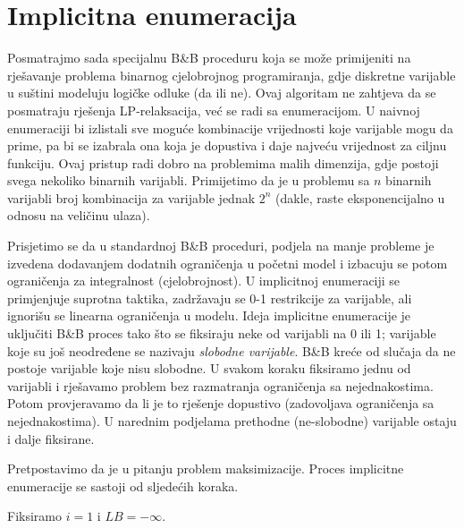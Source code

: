 \documentclass[a4paper, utf8, 11pt, colorlinks]{book}
\begin{document}
\section{Implicitna enumeracija}
Posmatrajmo sada specijalnu B\&B proceduru koja se može primijeniti na rješavanje problema binarnog cjelobrojnog programiranja, gdje diskretne varijable u suštini modeluju logičke odluke (da ili ne). Ovaj algoritam ne zahtjeva da se posmatraju rješenja LP-relaksacija, već se radi sa enumeracijom. U naivnoj enumeraciji bi izlistali sve moguće kombinacije vrijednosti koje varijable mogu da prime, pa bi se izabrala ona koja je dopustiva i daje najveću vrijednost za ciljnu funkciju. Ovaj pristup radi dobro na problemima malih dimenzija, gdje postoji svega nekoliko binarnih varijabli. Primijetimo da je u problemu sa $n$ binarnih varijabli broj kombinacija za varijable jednak $2^n$ (dakle, raste eksponencijalno u odnosu na veličinu ulaza). 

Prisjetimo se da u standardnoj B\&B proceduri, podjela na manje probleme je izvedena dodavanjem dodatnih ograničenja u početni model i izbacuju se potom ograničenja za integralnost (cjelobrojnost). 
U implicitnoj enumeraciji se primjenjuje suprotna taktika, zadržavaju se 0-1 restrikcije za varijable, ali ignorišu se linearna ograničenja u modelu. 
Ideja implicitne enumeracije je uključiti B\&B proces tako što se fiksiraju neke od varijabli na 0 ili 1; varijable koje su još neodređene se nazivaju \emph{slobodne varijable}.  B\&B kreće od slučaja da ne postoje varijable koje nisu slobodne. U svakom koraku fiksiramo jednu od varijabli i rješavamo problem bez razmatranja ograničenja sa nejednakostima. Potom provjeravamo da li je to rješenje dopustivo (zadovoljava ograničenja sa nejednakostima). U narednim podjelama  prethodne (ne-slobodne) varijable ostaju i dalje fiksirane. 


Pretpostavimo da je u pitanju problem maksimizacije. Proces implicitne enumeracije se sastoji od sljedećih koraka. 

Fiksiramo $i=1$ i $LB=-\infty$. 
\end{document}
